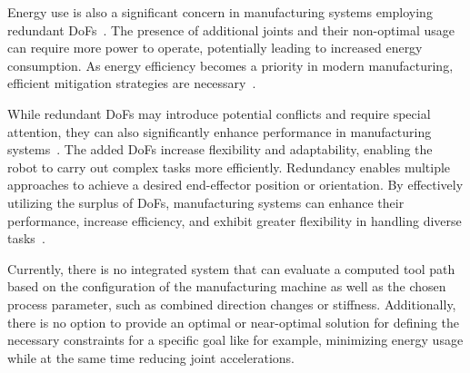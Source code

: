 Energy use is also a significant concern in manufacturing systems employing redundant \acrshort{DoF}s~\cite{Doan.2016}. The presence of additional joints and their non-optimal usage can require more power to operate, potentially leading to increased energy consumption. As energy efficiency becomes a priority in modern manufacturing, efficient mitigation strategies are necessary~\cite{Boscariol.2020, Boscariol.2019}. 

\newpage
While redundant \acrshort{DoF}s may introduce potential conflicts and require special attention, they can also significantly enhance performance in manufacturing systems~\cite{Ayten.2016}. The added \acrshort{DoF}s increase flexibility and adaptability, enabling the robot to carry out complex tasks more efficiently. Redundancy enables multiple approaches to achieve a desired end-effector position or orientation. By effectively utilizing the surplus of \acrshort{DoF}s, manufacturing systems can enhance their performance, increase efficiency, and exhibit greater flexibility in handling diverse tasks~\cite{Boscariol.2020}. 

Currently, there is no integrated system that can evaluate a computed tool path based on the configuration of the manufacturing machine as well as the chosen process parameter, such as combined direction changes or stiffness. %
Additionally, there is no option to provide an optimal or near-optimal solution for defining the necessary constraints for a specific goal like for example, minimizing energy usage while at the same time reducing joint accelerations.


